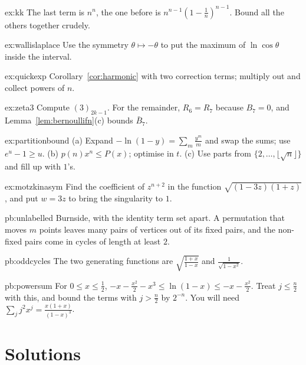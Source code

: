 \begin{hint}{ex:kk}
The last term is $n^n$, the one before is $n^{n-1}(1-\frac1n)^{n-1}$. Bound all the others together crudely.
\end{hint}
\begin{hint}{ex:wallislaplace}
Use the symmetry $\theta\mapsto-\theta$ to put the maximum of $\ln\cos\theta$ inside the interval.
\end{hint}
\begin{hint}{ex:quickexp}
Corollary~\ref{cor:harmonic} with two correction terms; multiply out and collect powers of $n$.
\end{hint}
\begin{hint}{ex:zeta3}
Compute $(3)_{2k-1}$. For the remainder, $R_6=R_7$ because $B_7=0$, and Lemma~\ref{lem:bernoullifn}(c) bounds $\bar B_7$.
\end{hint}
\begin{hint}{ex:partitionbound}
(a) Expand $-\ln(1-y)=\sum_m\frac{y^m}m$ and swap the sums; use $e^u-1\ge u$. (b) $p(n)x^n\le P(x)$; optimise in $t$. (c) Use parts from $\{2,\dots,\lfloor\sqrt n\rfloor\}$ and fill up with $1$'s.
\end{hint}
\begin{hint}{ex:motzkinasym}
Find the coefficient of $z^{n+2}$ in the function $\sqrt{(1-3z)(1+z)}$, and put $w=3z$ to bring the singularity to $1$.
\end{hint}

\begin{hint}{pb:unlabelled}
Burnside, with the identity term set apart. A permutation that moves $m$ points leaves many pairs of vertices out of
its fixed pairs, and the non-fixed pairs come in cycles of length at least $2$.
\end{hint}

\begin{hint}{pb:oddcycles}
The two generating functions are $\sqrt{\frac{1+x}{1-x}}$ and $\frac1{\sqrt{1-x^2}}$.
\end{hint}

\begin{hint}{pb:powersum}
For $0\le x\le\frac12$, $-x-\frac{x^2}2-x^3\le\ln(1-x)\le-x-\frac{x^2}2$. Treat $j\le\frac n2$ with this, and bound the terms with $j>\frac n2$ by $2^{-n}$. You will need
$\sum_jj^2x^j=\frac{x(1+x)}{(1-x)^3}$.
\end{hint}

\section{Solutions}

